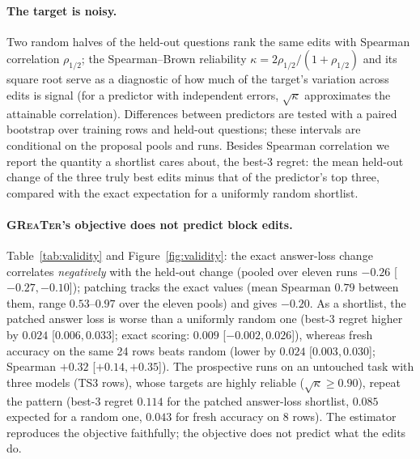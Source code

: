 \documentclass{article}
\newcommand{\greater}{\textsc{GReaTer}}
\begin{document}
\paragraph{The target is noisy.} Two random halves of the held-out questions rank the
same edits with Spearman correlation $\rho_{1/2}$; the Spearman--Brown reliability
$\kappa=2\rho_{1/2}/(1+\rho_{1/2})$ and its square root serve as a diagnostic of how much
of the target's variation across edits is signal (for a predictor with independent
errors, $\sqrt{\kappa}$ approximates the attainable correlation). Differences between
predictors are tested with a paired bootstrap over training rows and held-out questions;
these intervals are conditional on the proposal pools and runs. Besides Spearman
correlation we report the quantity a shortlist cares about, the best-3 regret: the mean
held-out change of the three truly best edits minus that of the predictor's top three,
compared with the exact expectation for a uniformly random shortlist.

\begin{table}[t]
\centering
\caption{\textbf{Spearman correlation between each predictor and the held-out accuracy
change of LLM-proposed block edits.} LD/TS rows: preregistered replication v3 (logical
deduction 3/7, tracking shuffled objects 7); TS3 rows: prospective test on an untouched
task. L: Llama-3-8B, Q: Qwen3-8B, G: Gemma-2-9B; $^\ast$ non-initial prompt state;
$\sqrt{\kappa}$: reliability diagnostic of the held-out target. Pooled: mean over runs
with a paired bootstrap interval conditional on the pools; cost: seconds per pool on one
A6000, including the shared sampling for forks.}
\label{tab:validity}
\resizebox{0.92\textwidth}{!}{}
\end{table}

\paragraph{\greater{}'s objective does not predict block edits.} Table~\ref{tab:validity}
and Figure~\ref{fig:validity}: the exact answer-loss change correlates \emph{negatively}
with the held-out change (pooled over eleven runs $-0.26$ [$-0.27,-0.10$]); patching
tracks the exact values (mean Spearman $0.79$ between them, range $0.53$--$0.97$ over the
eleven pools) and gives $-0.20$. As a shortlist, the patched answer loss is worse than a
uniformly random one (best-3 regret higher by $0.024$ [$0.006,0.033$]; exact scoring:
$0.009$ [$-0.002,0.026$]), whereas fresh accuracy on the same 24 rows beats random (lower
by $0.024$ [$0.003,0.030$]; Spearman $+0.32$ [$+0.14,+0.35$]). The prospective runs on an
untouched task with three models (TS3 rows), whose targets are highly reliable
($\sqrt{\kappa}\ge0.90$), repeat the pattern (best-3 regret $0.114$ for the patched
answer-loss shortlist, $0.085$ expected for a random one, $0.043$ for fresh accuracy on 8
rows). The estimator reproduces the objective faithfully; the objective does not
predict what the edits do.
\end{document}
